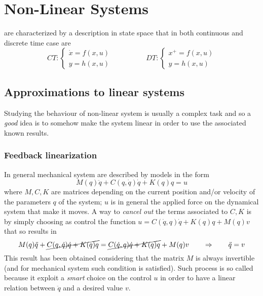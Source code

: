 \chapter{Non-Linear Systems}
	 are characterized by a description in state space that in both continuous and discrete time case are
	\begin{equation} \label{eq:nls:basic}
		CT: \begin{cases}
			\dot x = f(x,u) \\ 
			y = h(x,u)
		\end{cases} \hspace{2cm} DT: \begin{cases}
			x^+ = f(x,u) \\ 
			y = h(x,u)
		\end{cases}
	\end{equation}

\section{Approximations to linear systems}
	
	Studying the behaviour of non-linear system is usually a complex task and so a \textit{good} idea is to somehow make the system linear in order to use the associated known results.
	
	\subsection{Feedback linearization}
		In general mechanical system are described by models in the form
		\[ M(q) \ddot q + C(q,\dot q) \dot q + K(q) q = u \]
		where $M,C,K$ are matrices depending on the current position and/or velocity of the parameters $q$ of the system; $u$ is in general the applied force on the dynamical system that make it moves. A way to \textit{cancel out} the terms associated to $C,K$ is by simply choosing as control the function $u =C(\dot q,q)\dot q + K(q) q + M(q) v$ that so results in
		\[ M(q) \ddot q + \cancel{C(q,\dot q) \dot q + K(q) q} = \cancel{C(\dot q,q)\dot q + K(q) q} + M(q) v \qquad \Rightarrow \qquad \ddot q = v \]
		This result has been obtained considering that the matrix $M$ is always invertible (and for mechanical system such condition is satisfied). Such process is so called  because it exploit a \textit{smart} choice on the control $u$ in order to have a linear relation between $\ddot q$ and a desired value $v$.
	
